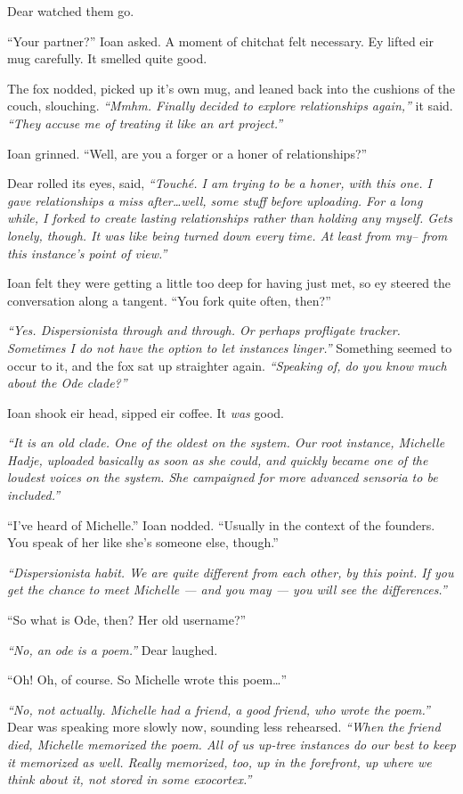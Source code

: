 Dear watched them go.

``Your partner?'' Ioan asked. A moment of chitchat felt necessary. Ey lifted eir mug carefully. It smelled quite good.

The fox nodded, picked up it's own mug, and leaned back into the cushions of the couch, slouching. \emph{``Mmhm. Finally decided to explore relationships again,''} it said. \emph{``They accuse me of treating it like an art project.''}

Ioan grinned. ``Well, are you a forger or a honer of relationships?''

Dear rolled its eyes, said, \emph{``Touché. I am trying to be a honer, with this one. I gave relationships a miss after\ldots{}well, some stuff before uploading. For a long while, I forked to create lasting relationships rather than holding any myself. Gets lonely, though. It was like being turned down every time. At least from my-- from this instance's point of view.''}

Ioan felt they were getting a little too deep for having just met, so ey steered the conversation along a tangent. ``You fork quite often, then?''

\emph{``Yes. Dispersionista through and through. Or perhaps profligate tracker. Sometimes I do not have the option to let instances linger.''} Something seemed to occur to it, and the fox sat up straighter again. \emph{``Speaking of, do you know much about the Ode clade?''}

Ioan shook eir head, sipped eir coffee. It \emph{was} good.

\emph{``It is an old clade. One of the oldest on the system. Our root instance, Michelle Hadje, uploaded basically as soon as she could, and quickly became one of the loudest voices on the system. She campaigned for more advanced sensoria to be included.''}

``I've heard of Michelle.'' Ioan nodded. ``Usually in the context of the founders. You speak of her like she's someone else, though.''

\emph{``Dispersionista habit. We are quite different from each other, by this point. If you get the chance to meet Michelle — and you may — you will see the differences.''}

``So what is Ode, then? Her old username?''

\emph{``No, an ode is a poem.''} Dear laughed.

``Oh! Oh, of course. So Michelle wrote this poem\ldots{}''

\emph{``No, not actually. Michelle had a friend, a good friend, who wrote the poem.''} Dear was speaking more slowly now, sounding less rehearsed. \emph{``When the friend died, Michelle memorized the poem. All of us up-tree instances do our best to keep it memorized as well. Really memorized, too, up in the forefront, up where we think about it, not stored in some exocortex.''}

